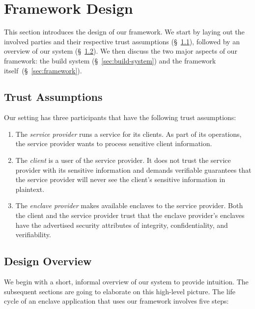 \section{Framework Design}
\label{sec:design}

This section introduces the design of our framework.  We start by laying out the
involved parties and their respective trust assumptions
(\S~\ref{sec:trust-assumptions}), followed by an overview of our system
(\S~\ref{sec:overview}).  We then discuss the two major aspects of our
framework: the build system (\S~\ref{sec:build-system}) and the framework
itself~(\S~\ref{sec:framework}).

\subsection{Trust Assumptions}
\label{sec:trust-assumptions}

Our setting has three participants that have the following trust assumptions:

\begin{enumerate}
    \item The \emph{service provider} runs a service for its clients.  As part
      of its operations, the service provider wants to process sensitive client
      information.

    \item The \emph{client} is a user of the service provider.  It does not
      trust the service provider with its sensitive information and demands
      verifiable guarantees that the service provider will never see the
      client's sensitive information in plaintext.

    \item The \emph{enclave provider} makes available enclaves to the service
      provider.  Both the client and the service provider trust that the enclave
      provider's enclaves have the advertised security attributes of integrity,
      confidentiality, and verifiability.
\end{enumerate}



\subsection{Design Overview}
\label{sec:overview}

We begin with a short, informal overview of our system to provide intuition.
The subsequent sections are going to elaborate on this high-level picture.
The life cycle of an enclave application that uses our framework involves five
steps:

